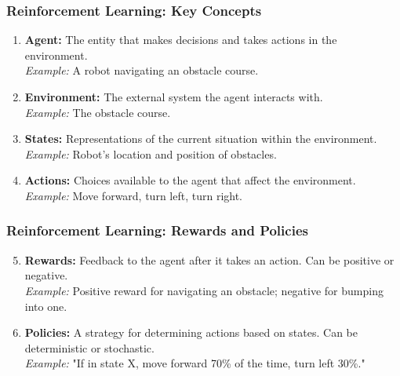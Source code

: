\documentclass{beamer}
\begin{document}
\begin{frame}[fragile]
    \frametitle{Reinforcement Learning: Key Concepts}
    \begin{enumerate}
        \item \textbf{Agent:}  
            The entity that makes decisions and takes actions in the environment. \\
            \textit{Example:} A robot navigating an obstacle course.
            
        \item \textbf{Environment:}  
            The external system the agent interacts with. \\
            \textit{Example:} The obstacle course.
            
        \item \textbf{States:}  
            Representations of the current situation within the environment. \\
            \textit{Example:} Robot's location and position of obstacles.

        \item \textbf{Actions:}  
            Choices available to the agent that affect the environment. \\
            \textit{Example:} Move forward, turn left, turn right.
    \end{enumerate}
\end{frame}

\begin{frame}[fragile]
    \frametitle{Reinforcement Learning: Rewards and Policies}
    \begin{enumerate}
        \setcounter{enumi}{4}  %
        \item \textbf{Rewards:}  
            Feedback to the agent after it takes an action. Can be positive or negative. \\
            \textit{Example:} Positive reward for navigating an obstacle; negative for bumping into one.

        \item \textbf{Policies:}  
            A strategy for determining actions based on states. Can be deterministic or stochastic. \\
            \textit{Example:} "If in state X, move forward 70\% of the time, turn left 30\%."
    \end{enumerate}
\end{frame}
\end{document}
